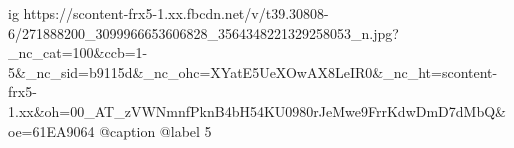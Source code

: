  
 
 
 
 

\ifcmt
  ig https://scontent-frx5-1.xx.fbcdn.net/v/t39.30808-6/271888200_3099966653606828_3564348221329258053_n.jpg?_nc_cat=100&ccb=1-5&_nc_sid=b9115d&_nc_ohc=XYatE5UeXOwAX8LeIR0&_nc_ht=scontent-frx5-1.xx&oh=00_AT_zVWNmnfPknB4bH54KU0980rJeMwe9FrrKdwDmD7dMbQ&oe=61EA9064
  @caption @label 5
\fi

